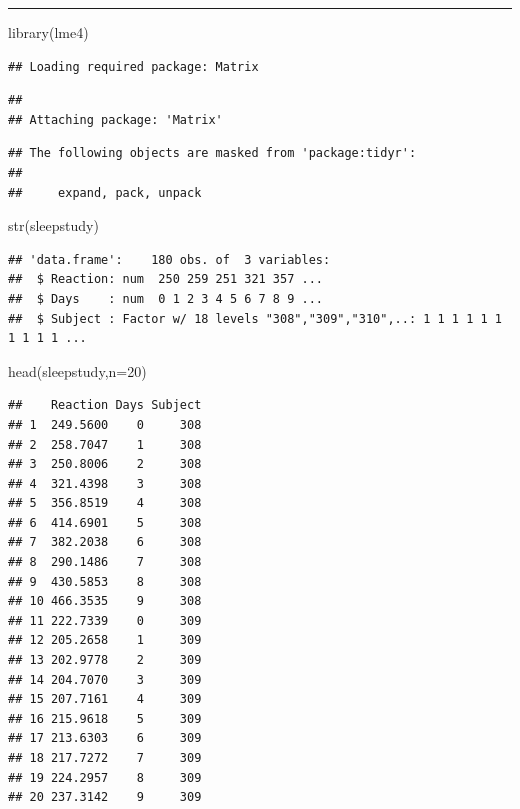 \documentclass[
]{book}
\newenvironment{Shaded}{\begin{snugshade}}{\end{snugshade}}
\newcommand{\AttributeTok}[1]{\textcolor[rgb]{0.77,0.63,0.00}{#1}}
\newcommand{\DecValTok}[1]{\textcolor[rgb]{0.00,0.00,0.81}{#1}}
\newcommand{\FunctionTok}[1]{\textcolor[rgb]{0.00,0.00,0.00}{#1}}
\newcommand{\NormalTok}[1]{#1}
\theoremstyle{definition}
\theoremstyle{definition}
\theoremstyle{definition}
\theoremstyle{remark}
\begin{document}
\begin{center}\rule{0.5\linewidth}{0.5pt}\end{center}

\begin{Shaded}
\begin{Highlighting}[]
\FunctionTok{library}\NormalTok{(lme4)}
\end{Highlighting}
\end{Shaded}

\begin{verbatim}
## Loading required package: Matrix
\end{verbatim}

\begin{verbatim}
## 
## Attaching package: 'Matrix'
\end{verbatim}

\begin{verbatim}
## The following objects are masked from 'package:tidyr':
## 
##     expand, pack, unpack
\end{verbatim}

\begin{Shaded}
\begin{Highlighting}[]
\FunctionTok{str}\NormalTok{(sleepstudy)}
\end{Highlighting}
\end{Shaded}

\begin{verbatim}
## 'data.frame':    180 obs. of  3 variables:
##  $ Reaction: num  250 259 251 321 357 ...
##  $ Days    : num  0 1 2 3 4 5 6 7 8 9 ...
##  $ Subject : Factor w/ 18 levels "308","309","310",..: 1 1 1 1 1 1 1 1 1 1 ...
\end{verbatim}

\begin{Shaded}
\begin{Highlighting}[]
\FunctionTok{head}\NormalTok{(sleepstudy,}\AttributeTok{n=}\DecValTok{20}\NormalTok{)}
\end{Highlighting}
\end{Shaded}

\begin{verbatim}
##    Reaction Days Subject
## 1  249.5600    0     308
## 2  258.7047    1     308
## 3  250.8006    2     308
## 4  321.4398    3     308
## 5  356.8519    4     308
## 6  414.6901    5     308
## 7  382.2038    6     308
## 8  290.1486    7     308
## 9  430.5853    8     308
## 10 466.3535    9     308
## 11 222.7339    0     309
## 12 205.2658    1     309
## 13 202.9778    2     309
## 14 204.7070    3     309
## 15 207.7161    4     309
## 16 215.9618    5     309
## 17 213.6303    6     309
## 18 217.7272    7     309
## 19 224.2957    8     309
## 20 237.3142    9     309
\end{verbatim}
\end{document}
